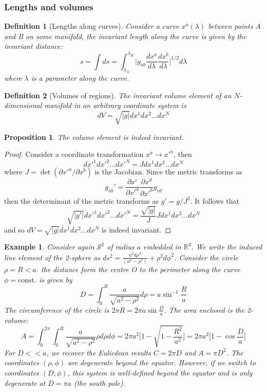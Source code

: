 \documentclass[a4paper]{article}
\newtheorem{eg}{Example}[section]
\theoremstyle{new}
\newtheorem{defi}{Definition}[section]
\newtheorem{prop}{Proposition}[section]
\begin{document}
\subsubsection{Lengths and volumes}
\begin{defi}[Lengths along curves]
Consider a curve $x^a(\lambda)$ between points A and B on some manifold, the invariant length along the curve is given by the invariant distance:
$$s=\int ds=\int_{\lambda_A}^{\lambda_B}\bigg|g_{ab}\frac{dx^a}{d\lambda}\frac{dx^b}{d\lambda}\bigg|^{1/2}d\lambda$$
where $\lambda$ is a parameter along the curve.
\end{defi}
\begin{defi}[Volumes of regions]
The invariant volume element of an $N$-dimensional manifold in an arbitrary coordinate system is
$$dV=\sqrt{|g|}dx^1dx^2\dots dx^N$$
\end{defi}
\begin{prop}
The volume element is indeed invariant.
\end{prop}
\begin{proof}
Consider a coordinate transformation $x^a\rightarrow x'^a$, then
$$dx'^1dx'^2\dots dx'^N=Jdx^1dx^2\dots dx^N$$
where $J=\det(\partial x'^a/\partial x^b)$ is the Jacobian. Since the metric transforms as 
$$g_{ab}'=\frac{\partial x^c}{\partial x'^a}\frac{\partial x^d}{\partial x'^b}g_{cd}$$
then the determinant of the metric transforms as $g'=g/J^2$. It follows that
$$\sqrt{|g'|}dx'^1dx'^2\dots dx'^N=\frac{\sqrt{|g|}}{J}Jdx^1 dx^2\dots dx^N$$
and so $dV=\sqrt{|g|}dx^1dx^2\dots dx^N$ is indeed invariant.
\end{proof}
\begin{eg}
Consider again $\mathcal{S}^2$ of radius $a$ embedded in $\mathbb{R}^3$. We write the induced line element of the 2-sphere as $ds^2=\frac{a^2d\rho^2}{(a^2-\rho^2)}+\rho^2d\phi^2$. Consider the circle $\rho=R<a$. the distance form the centre O to the perimeter along the curve $\phi=\text{const.}$ is given by
$$D=\int_0^R\frac{a}{\sqrt{a^2-\rho^2}}d\rho=a\sin^{-1}\frac{R}{a}$$
The circumference of the circle is $2\pi R=2\pi a\sin\frac{D}{a}$. The area enclosed is the 2-volume:
$$A=\int_0^{2\pi}\int_0^R\frac{a}{\sqrt{a^2-\rho^2}}\rho d\rho d\phi=2\pi a^2\bigg[1-\sqrt{1-\frac{R^2}{a^2}}\bigg]=2\pi a^2\bigg[1-\cos\frac{D}{a}\bigg]$$
For $D<<a$, we recover the Eulicdean results $C=2\pi D$ and $A=\pi D^2$. The coordinates $(\rho,\phi)$ are degenerate beyond the equator. However, if we switch to coordinates $(D,\phi)$, this system is well-defined beyond the equator and is only degenerate at $D=\pi a$ (the south pole).
\end{eg}
\end{document}
